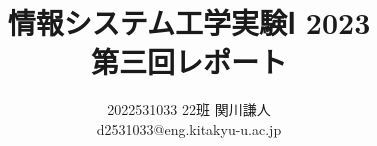 \documentclass[a4paper,titlepage,11pt]{ltjsarticle}
\begin{document}
\title{情報システム工学実験Ⅰ 2023\\第三回レポート}
\author{2022531033 22班 関川謙人\\d2531033@eng.kitakyu-u.ac.jp}
\maketitle
\end{document}
